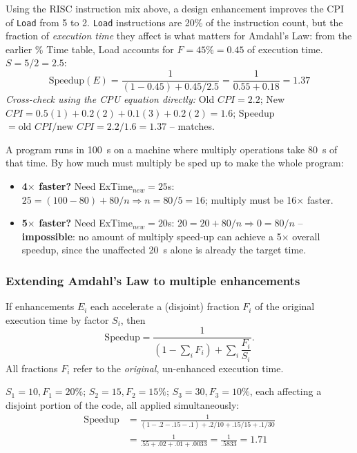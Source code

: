 \begin{eg}
Using the RISC instruction mix above, a design enhancement improves the CPI of \texttt{Load} from 5 to 2.
\texttt{Load} instructions are 20\% of the instruction count, but the
fraction of \emph{execution time} they affect is what matters for Amdahl's
Law: from the earlier \% Time table, Load accounts for $F=45\% = 0.45$ of
execution time. $S = 5/2 = 2.5$:
\[
  \text{Speedup}(E) = \frac{1}{(1-0.45) + 0.45/2.5} = \frac{1}{0.55+0.18}
  = 1.37
\]
\emph{Cross-check using the CPU equation directly:} Old $CPI = 2.2$; New
$CPI = 0.5(1) + 0.2(2) + 0.1(3) + 0.2(2) = 1.6$;
Speedup $= \text{old }CPI / \text{new }CPI = 2.2/1.6 = 1.37$ -- matches.
\end{eg}

\begin{eg}
A program runs in 100~s on a machine where multiply operations take 80~s of
that time. By how much must multiply be sped up to make the whole program:
\begin{itemize}
  \item \textbf{4$\times$ faster?} Need ExTime$_{new}=25$s:
  $25 = (100-80) + 80/n \Rightarrow n = 80/5 = 16$; multiply must be
  16$\times$ faster.
  \item \textbf{5$\times$ faster?} Need ExTime$_{new}=20$s:
  $20 = 20 + 80/n \Rightarrow 0 = 80/n$ -- \textbf{impossible}: no amount of
  multiply speed-up can achieve a 5$\times$ overall speedup, since the
  unaffected 20~s alone is already the target time.
\end{itemize}
\end{eg}

\subsubsection{Extending Amdahl's Law to multiple enhancements}
\begin{corollary}
If enhancements $E_i$ each accelerate a (disjoint) fraction $F_i$ of the
original execution time by factor $S_i$, then
\[
  \text{Speedup} = \frac{1}{\left(1-\sum_i F_i\right) + \sum_i \dfrac{F_i}{S_i}}.
\]
All fractions $F_i$ refer to the \emph{original}, un-enhanced execution time.
\end{corollary}

\begin{eg}
$S_1=10, F_1=20\%$; $S_2=15, F_2=15\%$; $S_3=30, F_3=10\%$, each affecting a
disjoint portion of the code, all applied simultaneously:
\begin{align*}
  \text{Speedup} &= \frac{1}{(1-.2-.15-.1) + .2/10 + .15/15 + .1/30}\\
  &= \frac{1}{.55 + .02 + .01 + .0033} = \frac{1}{.5833} = 1.71
\end{align*}
\end{eg}

